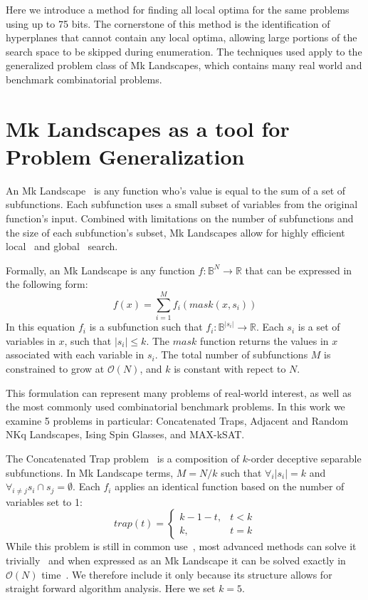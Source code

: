 \documentclass[runningheads,a4paper]{llncs}
\newcommand{\BigO}[1]{$\mathcal{O}{(#1)}$}
\begin{document}
Here we introduce a method for finding all local optima for the same problems using
up to 75 bits. The cornerstone of this method is the identification
of hyperplanes that cannot contain any local optima, allowing large
portions of the search space to be skipped during enumeration.
The techniques used apply to the generalized problem class of Mk Landscapes,
which contains many real world and benchmark combinatorial problems.



\section{Mk Landscapes as a tool for Problem Generalization}
\label{sec-mk}
An Mk Landscape~\cite{whitley:2015:mk} is any function
who's value is equal to the sum of a set of subfunctions.
Each subfunction uses a small subset of variables from the original function's input.
Combined with limitations on the number of subfunctions and the size of each subfunction's
subset, Mk Landscapes allow for highly efficient local~\cite{whitley:2012:constant,chicano:2014:ball}
and global~\cite{goldman:2015:GBO,tintos:2015:partitioncross} search.

Formally, an Mk Landscape is any function $f : \mathbb{B}^{N}\rightarrow \mathbb{R}$
that can be expressed in the following form:
\begin{equation}
  f(x) = \sum_{i=1}^{M} f_i(mask(x, s_i))
  \label{eq-mk}
\end{equation}
In this equation $f_i$ is a subfunction such that $f_i : \mathbb{B}^{|s_i|}\rightarrow \mathbb{R}$.
Each $s_i$ is a set of variables in $x$, such that $|s_i| \leq k$.
The $mask$ function
returns the values in $x$ associated with each variable in $s_i$.
The total number of subfunctions $M$ is constrained to grow at \BigO{N}, and $k$
is constant with repect to $N$.

This formulation can represent many problems of real-world interest, as well as
the most commonly used combinatorial benchmark problems. In this work we
examine 5 problems in particular: Concatenated Traps, Adjacent and Random NKq Landscapes,
Ising Spin Glasses, and MAX-kSAT.

The Concatenated Trap problem~\cite{deb:1992:trap} is a composition of $k$-order deceptive
separable subfunctions. In Mk Landscape terms, $M=N/k$ such that $\forall_i |s_i| = k$ and
$\forall_{i \neq j} s_i \cap s_j = \emptyset$. Each $f_i$ applies an identical function based
on the number of variables set to 1:
\begin{equation}
   trap(t) = \left\{
     \begin{array}{rl}
       k-1-t, &  t<k\\
       k,   &  t = k
     \end{array}
   \right.
  \label{eq-trap}
\end{equation}
While this problem is still in common use~\cite{hsu:2015:dsmgaII,inoue:2015:adaptivep3},
most advanced methods can solve it trivially~\cite{goldman:2012:ltga} and when expressed
as an Mk Landscape it can be solved exactly in \BigO{N} time~\cite{whitley:2015:mk}.
We therefore include it only because its structure allows for straight forward algorithm analysis.
Here we set $k=5$.
\end{document}
